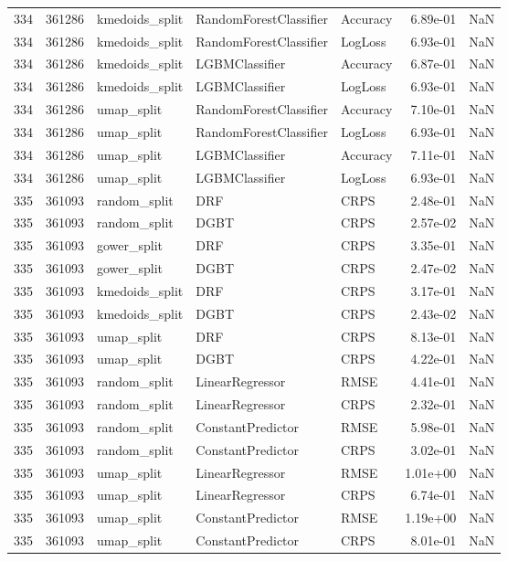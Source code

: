 \begin{tabular}{rrlllrr}
334 & 361286 & kmedoids\_split & RandomForestClassifier & Accuracy & 6.89e-01 & NaN \\
334 & 361286 & kmedoids\_split & RandomForestClassifier & LogLoss & 6.93e-01 & NaN \\
334 & 361286 & kmedoids\_split & LGBMClassifier & Accuracy & 6.87e-01 & NaN \\
334 & 361286 & kmedoids\_split & LGBMClassifier & LogLoss & 6.93e-01 & NaN \\
334 & 361286 & umap\_split & RandomForestClassifier & Accuracy & 7.10e-01 & NaN \\
334 & 361286 & umap\_split & RandomForestClassifier & LogLoss & 6.93e-01 & NaN \\
334 & 361286 & umap\_split & LGBMClassifier & Accuracy & 7.11e-01 & NaN \\
334 & 361286 & umap\_split & LGBMClassifier & LogLoss & 6.93e-01 & NaN \\
335 & 361093 & random\_split & DRF & CRPS & 2.48e-01 & NaN \\
335 & 361093 & random\_split & DGBT & CRPS & 2.57e-02 & NaN \\
335 & 361093 & gower\_split & DRF & CRPS & 3.35e-01 & NaN \\
335 & 361093 & gower\_split & DGBT & CRPS & 2.47e-02 & NaN \\
335 & 361093 & kmedoids\_split & DRF & CRPS & 3.17e-01 & NaN \\
335 & 361093 & kmedoids\_split & DGBT & CRPS & 2.43e-02 & NaN \\
335 & 361093 & umap\_split & DRF & CRPS & 8.13e-01 & NaN \\
335 & 361093 & umap\_split & DGBT & CRPS & 4.22e-01 & NaN \\
335 & 361093 & random\_split & LinearRegressor & RMSE & 4.41e-01 & NaN \\
335 & 361093 & random\_split & LinearRegressor & CRPS & 2.32e-01 & NaN \\
335 & 361093 & random\_split & ConstantPredictor & RMSE & 5.98e-01 & NaN \\
335 & 361093 & random\_split & ConstantPredictor & CRPS & 3.02e-01 & NaN \\
335 & 361093 & umap\_split & LinearRegressor & RMSE & 1.01e+00 & NaN \\
335 & 361093 & umap\_split & LinearRegressor & CRPS & 6.74e-01 & NaN \\
335 & 361093 & umap\_split & ConstantPredictor & RMSE & 1.19e+00 & NaN \\
335 & 361093 & umap\_split & ConstantPredictor & CRPS & 8.01e-01 & NaN \\

\end{tabular}
